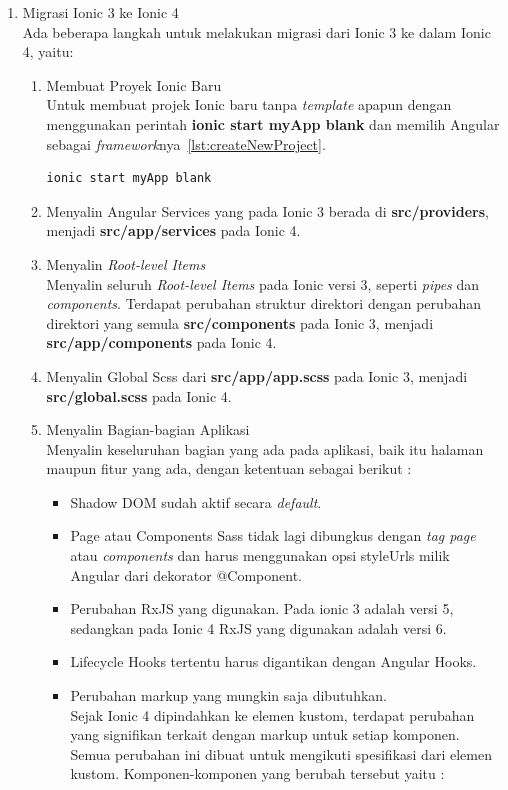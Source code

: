 \begin{enumerate}
	\item Migrasi Ionic 3 ke Ionic 4 \\
	Ada beberapa langkah untuk melakukan migrasi dari Ionic 3 ke dalam Ionic 4, yaitu:
	

	\begin{enumerate}
		\item Membuat Proyek Ionic Baru \\
		Untuk membuat projek Ionic baru tanpa {\it template} apapun dengan menggunakan perintah \textbf{ionic start myApp blank} dan memilih Angular sebagai {\it framework}nya~\ref{lst:createNewProject}.
\begin{lstlisting}[label={lst:createNewProject}, caption=Perintah Membuat Proyek Ionic Baru]
ionic start myApp blank
\end{lstlisting}

		\item Menyalin Angular Services yang pada Ionic 3 berada di \textbf{src/providers}, menjadi \textbf{src/app/services} pada Ionic 4.

		\item Menyalin {\it Root-level Items} \\
		Menyalin seluruh {\it Root-level Items} pada Ionic versi 3, seperti \textit{pipes} dan \textit{components}. Terdapat perubahan struktur direktori dengan perubahan direktori yang semula \textbf{src/components} pada Ionic 3, menjadi \textbf{src/app/components} pada Ionic 4.

		\item Menyalin Global Scss dari \textbf{src/app/app.scss} pada Ionic 3, menjadi \textbf{src/global.scss} pada Ionic 4.

		\item Menyalin Bagian-bagian Aplikasi \\
		Menyalin keseluruhan bagian yang ada pada aplikasi, baik itu halaman maupun fitur yang ada, dengan ketentuan sebagai berikut :

		\begin{itemize}
			\item Shadow DOM sudah aktif secara {\it default}.
			\item Page atau Components Sass tidak lagi dibungkus dengan \textit{tag page} atau \textit{components} dan harus menggunakan opsi styleUrls milik Angular dari dekorator @Component.
			\item Perubahan RxJS yang digunakan. Pada ionic 3 adalah versi 5, sedangkan pada Ionic 4 RxJS yang digunakan adalah versi 6.
			\item Lifecycle Hooks tertentu harus digantikan dengan Angular Hooks.
			\item Perubahan markup yang mungkin saja dibutuhkan. \\
			Sejak Ionic 4 dipindahkan ke elemen kustom, terdapat perubahan yang signifikan terkait dengan markup untuk setiap komponen. Semua perubahan ini dibuat untuk mengikuti spesifikasi dari elemen kustom. Komponen-komponen yang berubah tersebut yaitu :


\end{itemize}
\end{enumerate}
\end{enumerate}
